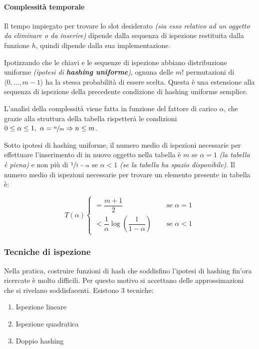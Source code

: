 \documentclass[italian, 10pt]{article}
\begin{document}
\paragraph{Complessità temporale}

Il tempo impiegato per trovare lo slot desiderato \textit{(sia esso relativo ad un oggetto da eliminare o da inserire)} dipende dalla sequenza di ispezione restituita dalla funzione \(h\), quindi dipende dalla sua implementazione.

Ipotizzando che le chiavi e le sequenze di ispezione abbiano distribuzione uniforme \textit{(ipotesi di \textbf{hashing uniforme})}, ognuna delle \(m!\) permutazioni di \(\langle 0, \ldots, m-1 \rangle\) ha la stessa probabilità di essere scelta.
Questa è una estensione alla sequenza di ispezione della precedente condizione di hashing uniforme semplice.

L'analisi della complessità viene fatta in funzione del fattore di carico \(\alpha\), che grazie alla struttura della tabella rispetterà le condizioni \(0 \leq \alpha \leq 1,\ \alpha = \sfrac{n}{m} \Rightarrow n \leq m\).

Sotto ipotesi di hashing uniforme, il numero medio di ispezioni necessarie per effettuare l'inserimento di in nuovo oggetto nella tabella è \(m\) se \(\alpha = 1\) \textit{(la tabella è piena)} e non più di \(\sfrac{1}{1-\alpha}\) se \(\alpha<1\) \textit{(se la tabella ha spazio disponibile)}.
Il numero medio di ispezioni necessarie per trovare un elemento presente in tabella è:

\[  T(\alpha) \begin{cases}
    = \dfrac{m+1}{2}                                         & \quad \text{ se } \alpha = 1 \\[5pt]
    < \dfrac{1}{\alpha} \log\left(\dfrac{1}{1-\alpha}\right) & \quad \text{ se } \alpha < 1
  \end{cases}  \]

\subsubsection{Tecniche di ispezione}

Nella pratica, costruire funzioni di hash che soddisfino l'ipotesi di hashing fin'ora ricercate è molto difficili.
Per questo motivo si accettano delle approssimazioni che si rivelano soddisfacenti.
Esistono \(3\) tecniche:

\begin{enumerate}
  \item Ispezione lineare
  \item Ispezione quadratica
  \item Doppio hashing
\end{enumerate}
\end{document}
